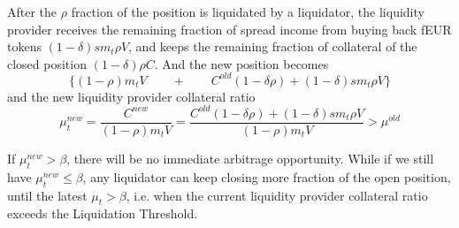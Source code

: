 \documentclass{article}
\begin{document}
\begin{center}
\end{center}

After the $\rho$ fraction of the position is liquidated by a liquidator, the liquidity provider receives the remaining fraction of spread income from buying back fEUR tokens $(1-\delta)s m_t \rho V$, and keeps the remaining fraction of collateral of the closed position $(1-\delta) \rho C$. And the new position becomes 
$$\{(1-\rho)m_t V \quad \quad + \quad \quad C^{old}(1-\delta \rho) + (1-\delta)s m_t \rho V\}$$
and the new liquidity provider collateral ratio
$$\mu_t^{new}=\frac{C^{new}}{(1-\rho)m_t V}=\frac{C^{old}(1-\delta \rho) + (1-\delta)s m_t \rho V}{(1-\rho)m_t V}>\mu^{old}$$

If $\mu_t^{new}>\beta$, there will be no immediate arbitrage opportunity. While if we still have $\mu_t^{new} \leq \beta$, any liquidator can keep closing more fraction of the open position, until the latest $\mu_t>\beta$, i.e. when the current liquidity provider collateral ratio exceeds the Liquidation Threshold.
\end{document}
